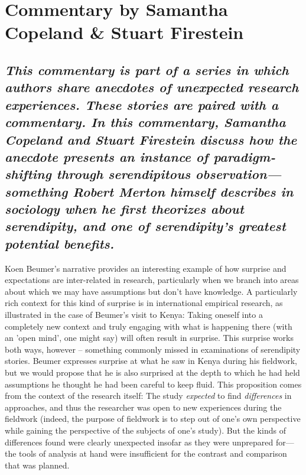 \documentclass[authordate, empirical]{jote-new-article}
\author[1]{\mbox{Samantha Copeland}}
\affil[1]{Delft University of Technology}
\author[2]{\mbox{Stuart Firestein}}
\affil[2]{Columbia University}
\begin{document}
\begin{frontmatter}
  \maketitle
  \begin{abstract}
    \printabstracttext
  \end{abstract}
\end{frontmatter}


	\section{Commentary by Samantha Copeland \& Stuart Firestein}



	\subsection{\emph{This commentary is part of a series in which authors share anecdotes of unexpected research experiences. These stories are paired with a commentary. In this commentary, Samantha Copeland and Stuart Firestein discuss how the anecdote presents an instance of paradigm-shifting through serendipitous observation—something Robert Merton himself describes in sociology when he first theorizes about serendipity, and one of serendipity's greatest potential benefits. }}



	Koen Beumer's narrative provides an interesting example of how surprise and expectations are inter-related in research, particularly when we branch into areas about which we may have assumptions but don't have knowledge. A particularly rich context for this kind of surprise is in international empirical research, as illustrated in the case of Beumer's visit to Kenya: Taking oneself into a completely new context and truly engaging with what is happening there (with an 'open mind', one might say) will often result in surprise. This surprise works both ways, however -- something commonly missed in examinations of serendipity stories. Beumer expresses surprise at what he saw in Kenya during his fieldwork, but we would propose that he is also surprised at the depth to which he had held assumptions he thought he had been careful to keep fluid. This proposition comes from the context of the research itself: The study \emph{expected} to find \emph{differences} in approaches, and thus the researcher was open to new experiences during the fieldwork (indeed, the purpose of fieldwork is to step out of one's own perspective while gaining the perspective of the subjects of one's study). But the kinds of differences found were clearly unexpected insofar as they were unprepared for—the tools of analysis at hand were insufficient for the contrast and comparison that was planned.
\end{document}
